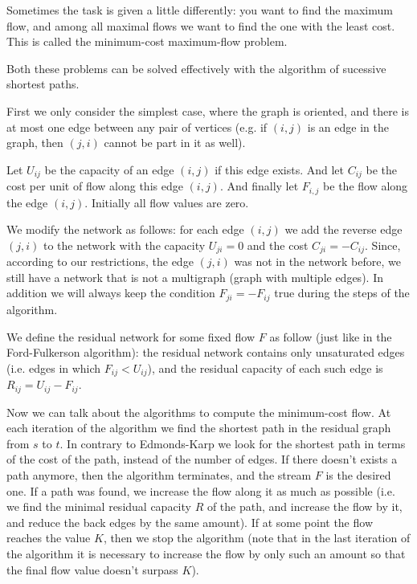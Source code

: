 \documentclass[8pt, a4paper, oneside, twocolumn]{extarticle}
\begin{document}
Sometimes the task is given a little differently: you want to find the maximum flow, and among all maximal flows we want to find the one with the least cost. This is called the minimum-cost maximum-flow problem.

Both these problems can be solved effectively with the algorithm of sucessive shortest paths.

First we only consider the simplest case, where the graph is oriented, and there is at most one edge between any pair of vertices (e.g. if $(i, j)$ is an edge in the graph, then $(j, i)$ cannot be part in it as well).

Let $U_{i j}$ be the capacity of an edge $(i, j)$ if this edge exists. And let $C_{i j}$ be the cost per unit of flow along this edge $(i, j)$. And finally let $F_{i, j}$ be the flow along the edge $(i, j)$. Initially all flow values are zero.

We modify the network as follows: for each edge $(i, j)$ we add the reverse edge $(j, i)$ to the network with the capacity $U_{j i} = 0$ and the cost $C_{j i} = -C_{i j}$. Since, according to our restrictions, the edge $(j, i)$ was not in the network before, we still have a network that is not a multigraph (graph with multiple edges). In addition we will always keep the condition $F_{j i} = -F_{i j}$ true during the steps of the algorithm.

We define the residual network for some fixed flow $F$ as follow (just like in the Ford-Fulkerson algorithm): the residual network contains only unsaturated edges (i.e. edges in which $F_{i j} < U_{i j}$), and the residual capacity of each such edge is $R_{i j} = U_{i j} - F_{i j}$.

Now we can talk about the algorithms to compute the minimum-cost flow. At each iteration of the algorithm we find the shortest path in the residual graph from $s$ to $t$. In contrary to Edmonds-Karp we look for the shortest path in terms of the cost of the path, instead of the number of edges. If there doesn't exists a path anymore, then the algorithm terminates, and the stream $F$ is the desired one. If a path was found, we increase the flow along it as much as possible (i.e. we find the minimal residual capacity $R$ of the path, and increase the flow by it, and reduce the back edges by the same amount). If at some point the flow reaches the value $K$, then we stop the algorithm (note that in the last iteration of the algorithm it is necessary to increase the flow by only such an amount so that the final flow value doesn't surpass $K$).
\end{document}
